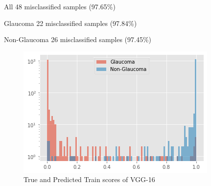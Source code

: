 \documentclass[conference]{IEEEtran}
\begin{document}
\begin{center}
All   48 misclassified samples (97.65\%)

Glaucoma  22 misclassified samples (97.84\%)

Non-Glaucoma  26 misclassified samples (97.45\%)
\end{center}
\vspace{5mm}
\begin{figure}[hbt!]
\centering
\includegraphics[scale=0.5]{fig-38.png}
\caption{True and Predicted Train scores of VGG-16}
\label{fig:x True and Predicted Train scores of VGG-16}
\end{figure}
\end{document}
